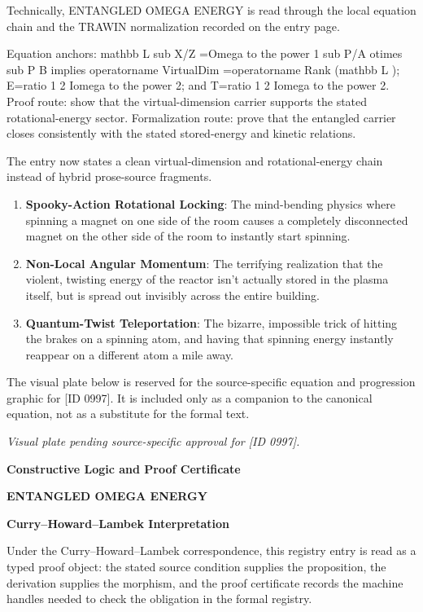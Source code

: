 Technically, ENTANGLED OMEGA ENERGY is read through the local equation chain and the TRAWIN normalization recorded on the entry page.

Equation anchors: mathbb L sub X/Z =Omega to the power 1 sub P/A otimes sub P B implies operatorname VirtualDim =operatorname Rank (mathbb L ); E=ratio 1 2 Iomega to the power 2; and T=ratio 1 2 Iomega to the power 2. Proof route: show that the virtual-dimension carrier supports the stated rotational-energy sector. Formalization route: prove that the entangled carrier closes consistently with the stated stored-energy and kinetic relations.

The entry now states a clean virtual-dimension and rotational-energy chain instead of hybrid prose-source fragments.
\endgroup

\begin{enumerate}[leftmargin=1.6em,itemsep=6pt,topsep=4pt]
\item \textbf{Spooky-Action Rotational Locking}: The mind-bending physics where spinning a magnet on one side of the room causes a completely disconnected magnet on the other side of the room to instantly start spinning.
\item \textbf{Non-Local Angular Momentum}: The terrifying realization that the violent, twisting energy of the reactor isn't actually stored in the plasma itself, but is spread out invisibly across the entire building.
\item \textbf{Quantum-Twist Teleportation}: The bizarre, impossible trick of hitting the brakes on a spinning atom, and having that spinning energy instantly reappear on a different atom a mile away.
\end{enumerate}

\begingroup\footnotesize\sloppy
The visual plate below is reserved for the source-specific equation and progression graphic for [ID 0997]. It is included only as a companion to the canonical equation, not as a substitute for the formal text.
\par\endgroup
\begingroup\footnotesize\itshape
Visual plate pending source-specific approval for [ID 0997].
\par\endgroup

\clearpage
\begingroup\tzpsupportsetup
\noindent\textbf{\fontsize{10.8pt}{12.8pt}\selectfont [ID 0997] Constructive Logic and Proof Certificate}\par
\noindent\textbf{\fontsize{10pt}{12pt}\selectfont ENTANGLED OMEGA ENERGY}\par
\vspace{0.45em}
\begingroup
\footnotesize
\setlength{\parskip}{0.22em}
\setlength{\parindent}{0pt}
\noindent\textbf{Curry--Howard--Lambek Interpretation}\par
Under the Curry--Howard--Lambek correspondence, this registry entry is read as a typed proof
object: the stated source condition supplies the proposition, the derivation supplies the
morphism, and the proof certificate records the machine handles needed to check the obligation
in the formal registry.


